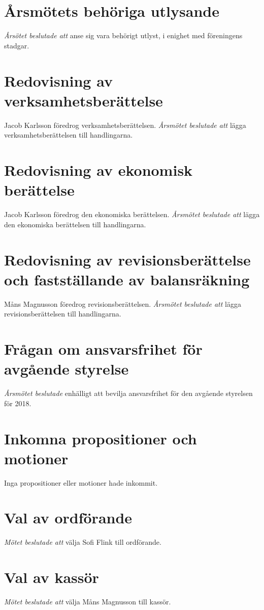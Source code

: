 \documentclass{article}
\begin{document}
\section{Årsmötets behöriga utlysande}
\emph{Årsötet beslutade att} anse sig vara behörigt utlyst, i enighet med föreningens stadgar.

\section{Redovisning av verksamhetsberättelse}
Jacob Karlsson föredrog verksamhetsberättelsen. \emph{Årsmötet beslutade att} lägga verksamhetsberättelsen till handlingarna.

\section{Redovisning av ekonomisk berättelse}
Jacob Karlsson föredrog den ekonomiska berättelsen. \emph{Årsmötet beslutade att} lägga den ekonomiska berättelsen till handlingarna.

\section{Redovisning av revisionsberättelse och fastställande av balansräkning}
Måns Magnusson föredrog revisionsberättelsen. \emph{Årsmötet beslutade att} lägga revisionsberättelsen till handlingarna.

\section{Frågan om ansvarsfrihet för avgående styrelse}
\emph{Årsmötet beslutade} enhälligt att bevilja ansvarsfrihet för den avgående styrelsen för 2018.

\section{Inkomna propositioner och motioner}
Inga propositioner eller motioner hade inkommit.

\section{Val av ordförande}
\emph{Mötet beslutade att} välja Sofi Flink till ordförande.

\section{Val av kassör}
\emph{Mötet beslutade att} välja Måns Magnusson till kassör.
\end{document}
